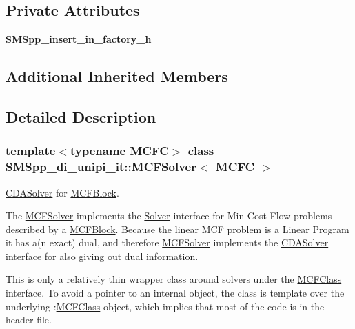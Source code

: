 \subsection*{Private Attributes}
\begin{DoxyCompactItemize}
\item 
\mbox{\label{class_s_m_spp__di__unipi__it_1_1_m_c_f_solver_a5618a1c2a09ff7cd62e4de9df7956672}} 
{\bfseries S\+M\+Spp\+\_\+insert\+\_\+in\+\_\+factory\+\_\+h}
\end{DoxyCompactItemize}
\subsection*{Additional Inherited Members}


\subsection{Detailed Description}
\subsubsection*{template$<$typename M\+C\+FC$>$\newline
class S\+M\+Spp\+\_\+di\+\_\+unipi\+\_\+it\+::\+M\+C\+F\+Solver$<$ M\+C\+F\+C $>$}

\mbox{\hyperlink{class_s_m_spp__di__unipi__it_1_1_c_d_a_solver}{C\+D\+A\+Solver}} for \mbox{\hyperlink{class_s_m_spp__di__unipi__it_1_1_m_c_f_block}{M\+C\+F\+Block}}. 

The \mbox{\hyperlink{class_s_m_spp__di__unipi__it_1_1_m_c_f_solver}{M\+C\+F\+Solver}} implements the \mbox{\hyperlink{class_s_m_spp__di__unipi__it_1_1_solver}{Solver}} interface for Min-\/\+Cost Flow problems described by a \mbox{\hyperlink{class_s_m_spp__di__unipi__it_1_1_m_c_f_block}{M\+C\+F\+Block}}. Because the linear M\+CF problem is a Linear Program it has a(n exact) dual, and therefore \mbox{\hyperlink{class_s_m_spp__di__unipi__it_1_1_m_c_f_solver}{M\+C\+F\+Solver}} implements the \mbox{\hyperlink{class_s_m_spp__di__unipi__it_1_1_c_d_a_solver}{C\+D\+A\+Solver}} interface for also giving out dual information.

This is only a relatively thin wrapper class around solvers under the \mbox{\hyperlink{class_m_c_f_class}{M\+C\+F\+Class}} interface. To avoid a pointer to an internal object, the class is template over the underlying \+:\mbox{\hyperlink{class_m_c_f_class}{M\+C\+F\+Class}} object, which implies that most of the code is in the header file. 


